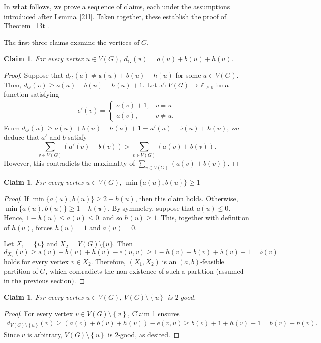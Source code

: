 \documentclass[11p]{elsarticle}
\newtheorem{claim}[theorem]{Claim}
\theoremstyle{definition}
\begin{document}
	In what follows, we prove a sequence of claims, each under the assumptions introduced after Lemma~\ref{21l}. Taken together, these establish the proof of Theorem~\ref{13t}.

The first three claims examine the vertices of $G$.

	\begin{claim}\label{21c}
		For every vertex $ u\in V(G) $, $ d_G(u)=a(u)+b(u)+h(u) $.
	\end{claim}
\begin{proof}
	Suppose that $ d_G(u)\neq a(u)+b(u)+h(u) $ for some $u\in V(G)$. Then, $ d_G(u)\ge a(u)+b(u)+h(u)+1 $. Let $ a'\colon V(G)\longrightarrow\mathbb{Z}_{\ge 0}$ be a function satisfying \begin{align*}
		a'(v)=\begin{cases}
			a(v)+1, &v=u\\a(v), &v\neq u.
		\end{cases}
	\end{align*}
From $ d_G(u)\ge a(u)+b(u)+h(u)+1 =a'(u)+b(u)+h(u)$, we deduce that $ a' $ and $ b $  satisfy   $$\sum_{v\in V(G)}(a'(v)+b(v))>\sum_{v\in V(G)}(a(v)+b(v)).$$ However, this contradicts  the maximality of $ \sum_{v\in V(G)}(a(v)+b(v)) $.
\end{proof}



\begin{claim}\label{222c}
	For every vertex $ u\in V(G) $, $\min\{a(u),b(u)\}\ge1$.
\end{claim}
\begin{proof}
		 If  $\min\{a(u),b(u)\}\ge2-h(u)$, then this claim holds. Otherwise,  $\min\{a(u),b(u)\}\ge1-h(u)$.  By symmetry, suppose that $ a(u)\le0 $. Hence, $ 1-h(u)\le a(u)\le0 $, and so $ h(u)\ge1 $. This, together with  definition of $ h(u) $, forces $ h(u)=1 $ and $ a(u)=0 $.

 Let $ X_1=\{u\} $ and $ X_2=V(G)\setminus\{u\} $.  Then $$ d_{X_2}(v)\ge a(v)+b(v)+h(v)-e(u,v)\ge 1-h(v)+b(v)+h(v)-1=b(v)$$ holds for every vertex $ v\in X_2 $. Therefore, $ (X_1,X_2) $ is  an $ (a,b) $-feasible partition of $ G $,  which contradicts the non-existence of such a partition (assumed in the previous section).
\end{proof}
\begin{claim}\label{22c}
		For every vertex $ u\in V(G) $, $  V(G)\setminus \left\lbrace u \right\rbrace  $ is  $ 2 $-good.
		\end{claim}
	\begin{proof}	For every vertex $ v\in V(G)\setminus\left\lbrace u \right\rbrace  $,   Claim \ref{222c} ensures     \begin{align*}
			d_{V(G)\setminus \left\lbrace u \right\rbrace }(v)\ge (a(v)+b(v)+h(v))-e(v,u)
			\ge b(v)+1+h(v)-1=b(v)+h(v).
		\end{align*}
			Since $ v $ is arbitrary, $ V(G)\setminus \left\lbrace u \right\rbrace $ is $ 2 $-good, as desired.	\end{proof}
\end{document}
